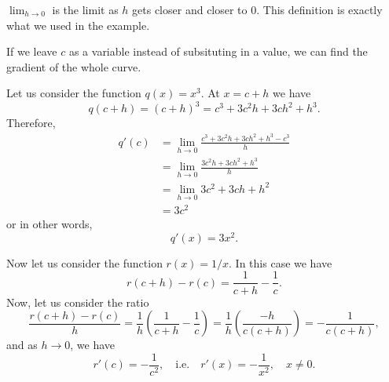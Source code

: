 $\lim_{h\rightarrow0}$ is the limit as $h$ gets closer and closer to 0. This definition is exactly what we used in the example.

If we leave $c$ as a variable instead of subsituting in a value, we can find the gradient of the whole curve.

\begin{example}\label{cubic-ex-deriv}
Let us consider the function $q(x)=x^3$. At $x=c+h$ we have
\[q(c+h)=(c+h)^3=c^3+3c^2h+3ch^2+h^3.\]
Therefore,
\begin{align}
q'(c)&=\lim_{h\rightarrow0}\frac{c^3+3c^2h+3ch^2+h^3-c^3}{h}\\
&=\lim_{h\rightarrow0}\frac{3c^2h+3ch^2+h^3}{h}\\
&=\lim_{h\rightarrow0}3c^2+3ch+h^2\\
&=3c^2
\end{align}
or in other words, \[q'(x)=3x^2.\]
\end{example}

\begin{example}
Now let us consider the function $r(x)=1/x$. In this case we have
\[r(c+h)-r(c)=\frac{1}{c+h}-\frac{1}{c}.\]
Now, let us consider the ratio
\[\frac{r(c+h)-r(c)}{h}=\frac{1}{h}\left(\frac{1}{c+h}-\frac{1}{c}\right)=\frac{1}{h}\left(\frac{-h}{c(c+h)}\right)=-\frac{1}{c(c+h)},\]
and as $h\to0$, we have
\[r'(c)=-\frac{1}{c^2},\quad \text{i.e.}\quad r'(x)=-\frac{1}{x^2},\quad x\ne0.\]
\end{example}

%
